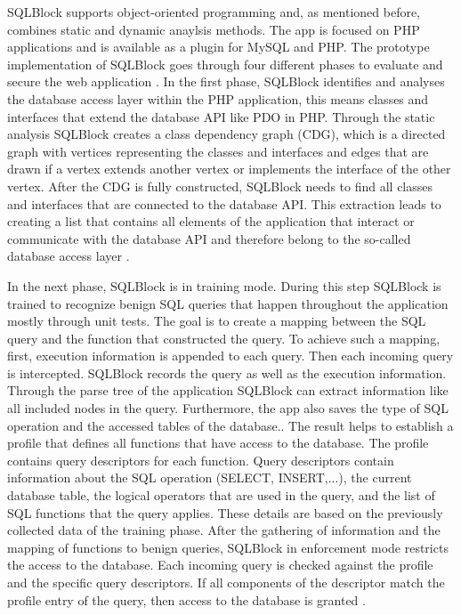 SQLBlock supports object-oriented programming and, as mentioned before, combines static and dynamic anaylsis methods. The app is focused on PHP applications and is available as a plugin for MySQL and PHP. The prototype implementation of SQLBlock goes through four different phases to evaluate and secure the web application \autocite[1, 5]{Jahanshahi2018}.\newline
In the first phase, SQLBlock identifies and analyses the database access layer within the PHP application, this means classes and interfaces that extend the database API like PDO in PHP. Through the static analysis SQLBlock creates a class dependency graph (CDG), which is a directed graph with vertices representing the classes and interfaces and edges that are drawn if a vertex extends another vertex or implements the interface of the other vertex. After the CDG is fully constructed, SQLBlock needs to find all classes and interfaces that are connected to the database API. This extraction leads to creating a list that contains all elements of the application that interact or communicate with the database API and therefore belong to the so-called database access layer \autocite[3, 6]{Jahanshahi2018}.\newline


In the next phase, SQLBlock is in training mode. During this step SQLBlock is trained to recognize benign SQL queries that happen throughout the application mostly through unit tests. The goal is to create a mapping between the SQL query and the function that constructed the query. To achieve such a mapping, first, execution information is appended to each query. Then each incoming query is intercepted. SQLBlock records the query as well as the execution information. Through the parse tree of the application SQLBlock can extract information like all included nodes in the query. Furthermore, the app also saves the type of SQL operation and the accessed tables of the database.\autocite[6]{Jahanshahi2018}. The result helps to establish a profile that defines all functions that have access to the database. The profile contains query descriptors for each function. Query descriptors contain information about the SQL operation (SELECT, INSERT,...), the current database table, the logical operators that are used in the query, and the list of SQL functions that the query applies. These details are based on the previously collected data of the training phase. After the gathering of information and the mapping of functions to benign queries, SQLBlock in enforcement mode restricts the access to the database. Each incoming query is checked against the profile and the specific query descriptors. If all components of the descriptor match the profile entry of the query, then access to the database is granted \autocite[7]{Jahanshahi2018}.\newline

